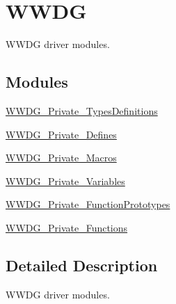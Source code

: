 \hypertarget{group___w_w_d_g}{\section{W\-W\-D\-G}
\label{group___w_w_d_g}
}


W\-W\-D\-G driver modules.  


\subsection*{Modules}
\begin{DoxyCompactItemize}
\item 
\hyperlink{group___w_w_d_g___private___types_definitions}{W\-W\-D\-G\-\_\-\-Private\-\_\-\-Types\-Definitions}
\item 
\hyperlink{group___w_w_d_g___private___defines}{W\-W\-D\-G\-\_\-\-Private\-\_\-\-Defines}
\item 
\hyperlink{group___w_w_d_g___private___macros}{W\-W\-D\-G\-\_\-\-Private\-\_\-\-Macros}
\item 
\hyperlink{group___w_w_d_g___private___variables}{W\-W\-D\-G\-\_\-\-Private\-\_\-\-Variables}
\item 
\hyperlink{group___w_w_d_g___private___function_prototypes}{W\-W\-D\-G\-\_\-\-Private\-\_\-\-Function\-Prototypes}
\item 
\hyperlink{group___w_w_d_g___private___functions}{W\-W\-D\-G\-\_\-\-Private\-\_\-\-Functions}
\end{DoxyCompactItemize}


\subsection{Detailed Description}
W\-W\-D\-G driver modules. 
